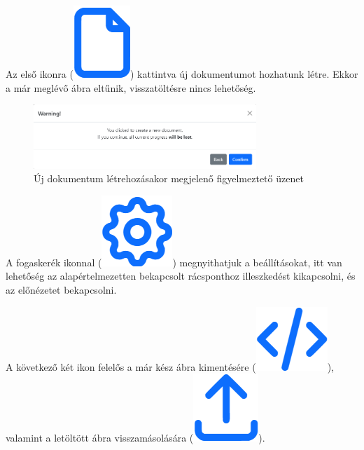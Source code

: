 Az első ikonra 
(\includegraphics[height=\fontcharht\font`\B]{images/new.png})
kattintva új dokumentumot hozhatunk létre. Ekkor a már meglévő ábra eltűnik, visszatöltésre nincs lehetőség.

\begin{figure}[!h]
	\label{fig:new}
	\centering
	\includegraphics[width=0.75\textwidth]{images/new_modal.png}
	\caption{Új dokumentum létrehozásakor megjelenő figyelmeztető üzenet}
\end{figure}

A fogaskerék ikonnal 
(\includegraphics[height=\fontcharht\font`\B]{images/settings.png})
megnyithatjuk a beállításokat, itt van lehetőség az alapértelmezetten bekapcsolt rácsponthoz illeszkedést kikapcsolni, és az előnézetet bekapcsolni.

A következő két ikon felelős a már kész ábra kimentésére 
(\includegraphics[height=\fontcharht\font`\B]{images/save.png}),
valamint a letöltött ábra visszamásolására
(\includegraphics[height=\fontcharht\font`\B]{images/load.png}).

